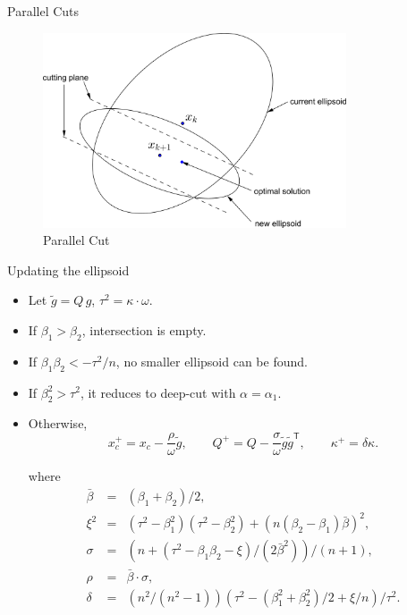 \documentclass[
  ignorenonframetext,
  aspectratio=169,
  serif,onlymath]{beamer}
\begin{document}
\begin{frame}{Parallel Cuts}
\protect\hypertarget{parallel-cuts-2}{}

\begin{figure}
\centering
\includegraphics[width=0.8\textwidth,height=\textheight]{ellipsoid.files/parallel_cut.pdf}
\caption{Parallel Cut}
\end{figure}

\end{frame}

\begin{frame}{Updating the ellipsoid}
\protect\hypertarget{updating-the-ellipsoid}{}

\begin{itemize}
\item
  Let \(\tilde{g} = Q\,g\), \(\tau^2 = \kappa\cdot\omega\).
\item
  If \(\beta_1 > \beta_2\), intersection is empty.
\item
  If \(\beta_1 \beta_2 < -\tau^2/n\), no smaller ellipsoid can be found.
\item
  If \(\beta_2^2 > \tau^2\), it reduces to deep-cut with
  \(\alpha = \alpha_1\).
\item
  Otherwise, \[x_c^+ = x_c - \frac{\rho}{\omega} \tilde{g}, \qquad
  Q^+ = Q - \frac{\sigma}{\omega} \tilde{g}\tilde{g}^\mathsf{T}, \qquad
  \kappa^+ =  \delta \kappa. \]

  where \[\begin{array}{lll}
    \bar{\beta} &=& (\beta_1 + \beta_2)/2, \\
    \xi^2 &=& (\tau^2 - \beta_1^2)(\tau^2 - \beta_2^2) + (n(\beta_2 - \beta_1)\bar{\beta})^2, \\
    \sigma &=& (n + (\tau^2 - \beta_1\beta_2 - \xi)/(2\bar{\beta}^2)) / (n + 1), \\
    \rho &=& \bar{\beta}\cdot\sigma, \\
    \delta &=& (n^2/(n^2-1)) (\tau^2 - (\beta_1^2 + \beta_2^2)/2 + \xi/n) / \tau^2 .
   \end{array}\]
\end{itemize}

\end{frame}
\end{document}
